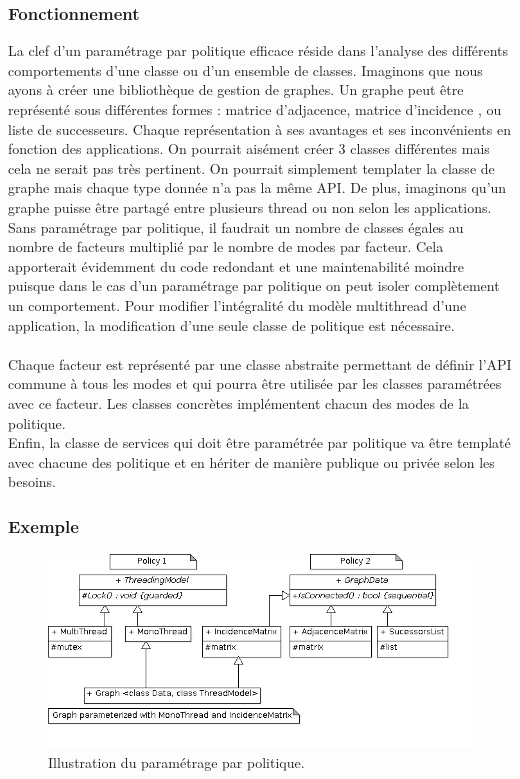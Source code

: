 \subsubsection{Fonctionnement}
La clef d'un paramétrage par politique efficace réside dans l'analyse des différents comportements d'une classe ou d'un ensemble de classes. Imaginons que nous ayons à créer une bibliothèque de gestion de graphes. Un graphe peut être représenté sous différentes formes : matrice d'adjacence, matrice d'incidence , ou liste de successeurs. Chaque représentation à ses avantages et ses inconvénients en fonction des applications. On pourrait aisément créer 3 classes différentes mais cela ne serait pas très pertinent. On pourrait simplement templater la classe de graphe mais chaque type donnée n'a pas la même API. De plus, imaginons qu'un graphe puisse être partagé entre plusieurs thread ou non selon les applications.\\
Sans paramétrage par politique, il faudrait un nombre de classes égales au nombre de facteurs multiplié par le nombre de modes par facteur. Cela apporterait évidemment du code redondant et une maintenabilité moindre puisque dans le cas d'un paramétrage par politique on peut isoler complètement un comportement. Pour modifier l'intégralité du modèle multithread d'une application, la modification d'une seule classe de politique est nécessaire.\\\\

Chaque facteur est représenté par une classe abstraite permettant de définir l'API commune à tous les modes et qui pourra être utilisée par les classes paramétrées avec ce facteur. Les classes concrètes implémentent chacun des modes de la politique.\\
Enfin, la classe de services qui doit être paramétrée par politique va être templaté avec chacune des politique et en hériter de manière publique ou privée selon les besoins.

\subsubsection{Exemple}

\begin{figure}[!h]\centering
    \includegraphics[scale=0.7]{images/policy_illu.png}
    \caption{\label{policy_uml} Illustration du paramétrage par politique.}
\end{figure}

